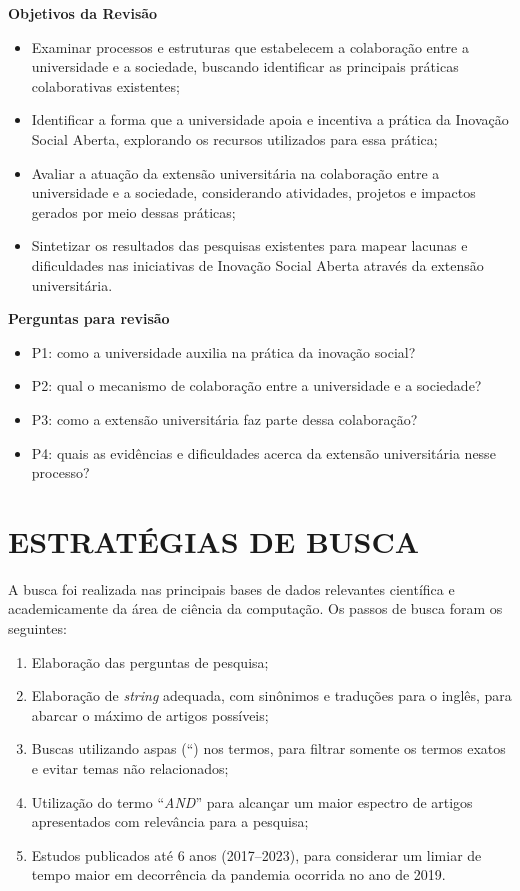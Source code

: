\textbf{Objetivos da Revisão}
\begin{itemize}
    \item Examinar processos e estruturas que estabelecem a colaboração entre a universidade e a sociedade, buscando identificar as principais práticas colaborativas existentes;
    \item Identificar a forma que a universidade apoia e incentiva a prática da Inovação Social Aberta, explorando os recursos utilizados para essa prática;
    \item Avaliar a atuação da extensão universitária na colaboração entre a universidade e a sociedade, considerando atividades, projetos e impactos gerados por meio dessas práticas;
    \item Sintetizar os resultados das pesquisas existentes para mapear lacunas e dificuldades nas iniciativas de Inovação Social Aberta através da extensão universitária.
    \par\vspace{1\baselineskip}
\end{itemize}

\textbf{Perguntas para revisão}
\begin{itemize}
    \item P1: como a universidade auxilia na prática da inovação social?
    \item P2: qual o mecanismo de colaboração entre a universidade e a sociedade? \cite{brunswicker2018}
    \item P3: como a extensão universitária faz parte dessa colaboração?
    \item P4: quais as evidências e dificuldades acerca da extensão universitária nesse processo? 
\end{itemize}

\section{ESTRATÉGIAS DE BUSCA}
A busca foi realizada nas principais bases de dados relevantes científica e academicamente da área de ciência da computação. Os passos de busca foram os seguintes:
\begin{enumerate}
    \item Elaboração das perguntas de pesquisa;
    \item Elaboração de \textit{string} adequada, com sinônimos e traduções para o inglês, para abarcar o máximo de artigos possíveis;
    \item Buscas utilizando aspas (“) nos termos, para filtrar somente os termos exatos e evitar temas não relacionados;
    \item Utilização do termo “\textit{AND}” para alcançar um maior espectro de artigos apresentados com relevância para a pesquisa;
    \item Estudos publicados até 6 anos (2017–2023), para considerar um limiar de tempo maior em decorrência da pandemia ocorrida no ano de 2019. 
\end{enumerate}

